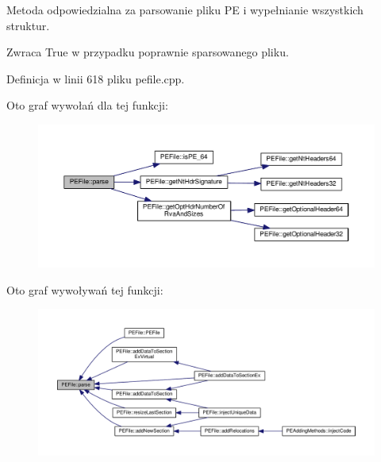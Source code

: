 Metoda odpowiedzialna za parsowanie pliku P\-E i wypełnianie wszystkich struktur. 

\begin{DoxyReturn}{Zwraca}
True w przypadku poprawnie sparsowanego pliku. 
\end{DoxyReturn}


Definicja w linii 618 pliku pefile.\-cpp.



Oto graf wywołań dla tej funkcji\-:
\nopagebreak
\begin{figure}[H]
\begin{center}
\leavevmode
\includegraphics[width=350pt]{class_p_e_file_a5cad3b303c988a59e0df69eeea762638_cgraph}
\end{center}
\end{figure}




Oto graf wywoływań tej funkcji\-:
\nopagebreak
\begin{figure}[H]
\begin{center}
\leavevmode
\includegraphics[width=350pt]{class_p_e_file_a5cad3b303c988a59e0df69eeea762638_icgraph}
\end{center}
\end{figure}


